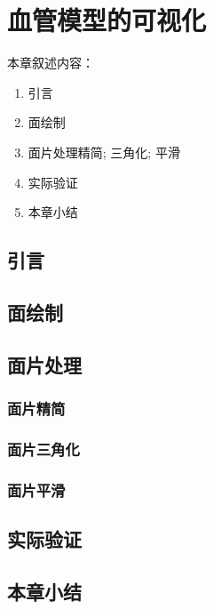 \chapter{血管模型的可视化}
\label{chap4}

本章叙述内容：
\begin{enumerate}
  \item 引言
  \item 面绘制
  \item 面片处理{精简; 三角化; 平滑}
  \item 实际验证
  \item 本章小结
\end{enumerate}

\section{引言}

\section{面绘制}

\section{面片处理}

\subsection{面片精简}

\subsection{面片三角化}

\subsection{面片平滑}

\section{实际验证}

\section{本章小结}